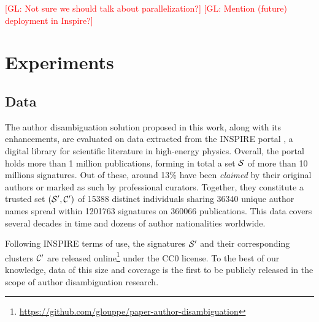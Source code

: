 \documentclass{article}
\newcommand{\glnote}[1]{\textcolor{red}{[GL: #1]}}
\begin{document}
\glnote{Not sure we should talk about parallelization?}
\glnote{Mention (future) deployment in Inspire?}




\section{Experiments}
\label{experiments}

\subsection{Data}

The author disambiguation solution proposed in this work, along with its
enhancements, are evaluated on data extracted from the INSPIRE portal
\citep{gentil2009information}, a digital library for scientific literature in
high-energy physics. Overall, the portal holds more than 1 million
publications, forming in total a set ${\cal S}$ of more than 10 millions
signatures. Out of these, around 13\% have been \textit{claimed} by their
original authors or marked as such by professional curators. Together, they
constitute a trusted set $({\cal S}^\prime, {\cal C}^\prime)$ of 15388 distinct individuals sharing
36340 unique author names spread within 1201763 signatures on 360066
publications. This data covers several decades in time and dozens of author
nationalities worldwide.

Following INSPIRE terms of use, the signatures ${\cal S}^\prime$ and their
corresponding clusters ${\cal C}^\prime$ are released
online\footnote{\url{https://github.com/glouppe/paper-author-disambiguation}}
under the CC0 license. To the best of our knowledge, data of this size and
coverage is the first to be publicly released in the scope of author
disambiguation research.
\end{document}
